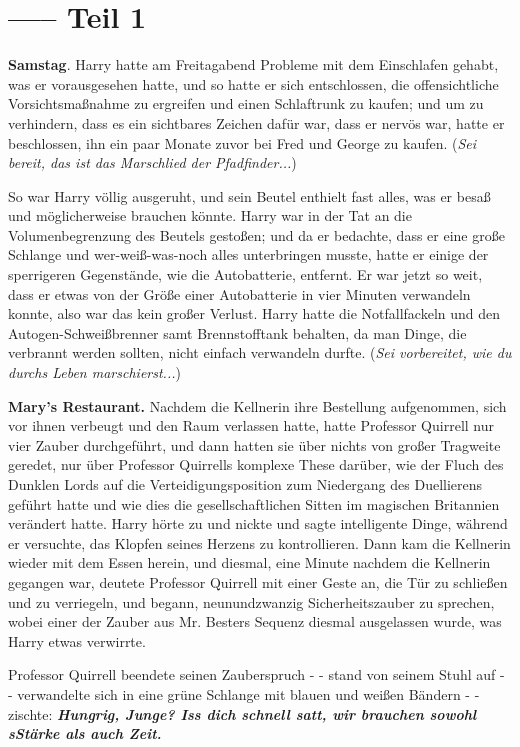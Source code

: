 \chapter{----- Teil 1}

\textbf{Samstag}. Harry hatte am Freitagabend Probleme mit dem Einschlafen
gehabt, was er vorausgesehen hatte, und so hatte er sich entschlossen, die
offensichtliche Vorsichtsmaßnahme zu ergreifen und einen Schlaftrunk zu kaufen;
und um zu verhindern, dass es ein sichtbares Zeichen dafür war, dass er nervös
war, hatte er beschlossen, ihn ein paar Monate zuvor bei Fred und George zu
kaufen. (\emph{Sei bereit, das ist das Marschlied der Pfadfinder...})

So war Harry völlig ausgeruht, und sein Beutel enthielt fast alles, was er besaß
und möglicherweise brauchen könnte. Harry war in der Tat an die
Volumenbegrenzung des Beutels gestoßen; und da er bedachte, dass er eine große
Schlange und wer-weiß-was-noch alles unterbringen musste, hatte er einige der
sperrigeren Gegenstände, wie die Autobatterie, entfernt. Er war jetzt so weit,
dass er etwas von der Größe einer Autobatterie in vier Minuten verwandeln
konnte, also war das kein großer Verlust. Harry hatte die Notfallfackeln und den
Autogen-Schweißbrenner samt Brennstofftank behalten, da man Dinge, die verbrannt
werden sollten, nicht einfach verwandeln durfte. (\emph{Sei vorbereitet, wie du
durchs Leben marschierst...})

\textbf{Mary's Restaurant.}
Nachdem die Kellnerin ihre Bestellung aufgenommen, sich vor ihnen verbeugt und
den Raum verlassen hatte, hatte Professor Quirrell nur vier Zauber durchgeführt,
und dann hatten sie über nichts von großer Tragweite geredet, nur über Professor
Quirrells komplexe These darüber, wie der Fluch des Dunklen Lords auf die
Verteidigungsposition zum Niedergang des Duellierens geführt hatte und wie dies
die gesellschaftlichen Sitten im magischen Britannien verändert hatte. Harry
hörte zu und nickte und sagte intelligente Dinge, während er versuchte, das
Klopfen seines Herzens zu kontrollieren. Dann kam die Kellnerin wieder mit dem
Essen herein, und diesmal, eine Minute nachdem die Kellnerin gegangen war,
deutete Professor Quirrell mit einer Geste an, die Tür zu schließen und zu
verriegeln, und begann, neunundzwanzig Sicherheitszauber zu sprechen, wobei
einer der Zauber aus Mr. Besters Sequenz diesmal ausgelassen wurde, was Harry
etwas verwirrte.

Professor Quirrell beendete seinen Zauberspruch - - stand von seinem Stuhl auf -
- verwandelte sich in eine grüne Schlange mit blauen und weißen Bändern - -
zischte: \glqq{}\textbf{\emph{Hungrig, Junge? Iss dich schnell satt, wir brauchen
sowohl sStärke als auch Zeit.}}\grqq{}

